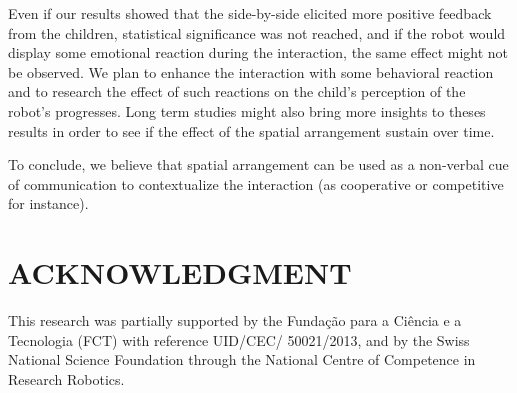 \documentclass[letterpaper, 10 pt, conference]{ieeeconf}  %
\begin{document}
Even if our results showed that the side-by-side elicited more positive feedback from the children, statistical significance was not reached, and if the robot would display some emotional reaction during the interaction, the same effect might not be observed. 
We plan to enhance the interaction with some behavioral reaction and to research the effect of such reactions on the child's perception of the robot's progresses. 
Long term studies might also bring more insights to theses results in order to see if the effect of the spatial arrangement sustain over time.

To conclude, we believe that spatial arrangement can be used as a non-verbal cue of communication to contextualize the interaction (as cooperative or competitive for instance).












\vspace{-0.1cm}
\section*{ACKNOWLEDGMENT}
\vspace{-0.2cm}
\small
This research was partially supported by the Funda\c{c}\~{a}o para a Ci\^{e}ncia
e a Tecnologia (FCT) with reference UID/CEC/ 50021/2013, and by the Swiss
National Science Foundation through the National Centre of Competence in
Research Robotics.






\small


\end{document}
